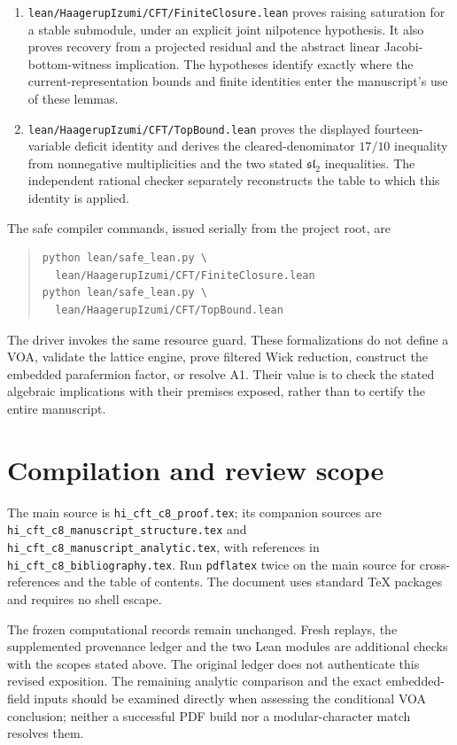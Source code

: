 \documentclass[11pt,a4paper]{article}
\theoremstyle{definition}
\newcommand{\artifact}[1]{\textnormal{\nolinkurl{#1}}}
\begin{document}
\begin{enumerate}
\item \artifact{lean/HaagerupIzumi/CFT/FiniteClosure.lean} proves
raising saturation for a stable submodule, under an explicit joint
nilpotence hypothesis. It also proves recovery from a projected
residual and the abstract linear Jacobi-bottom-witness implication.
The hypotheses identify exactly where the current-representation
bounds and finite identities enter the manuscript's use of these
lemmas.
\item \artifact{lean/HaagerupIzumi/CFT/TopBound.lean} proves the
displayed fourteen-variable deficit identity and derives the
cleared-denominator $17/10$ inequality from nonnegative
multiplicities and the two stated $\mathfrak{sl}_2$ inequalities.
The independent rational checker separately reconstructs the
table to which this identity is applied.
\end{enumerate}

The safe compiler commands, issued serially from the project root, are
\begin{quote}\small
\begin{verbatim}
python lean/safe_lean.py \
  lean/HaagerupIzumi/CFT/FiniteClosure.lean
python lean/safe_lean.py \
  lean/HaagerupIzumi/CFT/TopBound.lean
\end{verbatim}
\end{quote}
The driver invokes the same resource guard. These formalizations do
not define a VOA, validate the lattice engine, prove filtered Wick
reduction, construct the embedded parafermion factor, or resolve A1.
Their value is to check the stated algebraic implications with their
premises exposed, rather than to certify the entire manuscript.

\section{Compilation and review scope}\label{sec:compilation}
The main source is \artifact{hi_cft_c8_proof.tex}; its companion sources
are \artifact{hi_cft_c8_manuscript_structure.tex} and
\artifact{hi_cft_c8_manuscript_analytic.tex}, with references in
\artifact{hi_cft_c8_bibliography.tex}. Run \texttt{pdflatex} twice
on the main source for cross-references and the table of contents.
The document uses standard TeX packages and requires no shell escape.

The frozen computational records remain unchanged. Fresh replays,
the supplemented provenance ledger and the two Lean modules are
additional checks with the scopes stated above. The original ledger
does not authenticate this revised exposition. The remaining analytic
comparison and the exact embedded-field inputs should be examined
directly when assessing the conditional VOA conclusion; neither a
successful PDF build nor a modular-character match resolves them.

\end{document}

